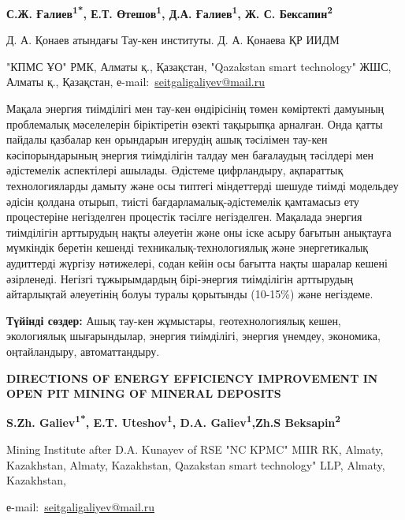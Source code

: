 {\bfseries С.Ж. Ғалиев\textsuperscript{1*}, Е.Т. Өтешов\textsuperscript{1},
Д.А. Ғалиев\textsuperscript{1}, Ж. С. Бексапин\textsuperscript{2}}

Д. А. Қонаев атындағы Тау-кен институты. Д. А. Қонаева ҚР ИИДМ

"КПМС ҰО" РМК, Алматы қ., Қазақстан, "Qazakstan smart technology" ЖШС,
Алматы қ., Қазақстан,
е-mail:~\href{https://e.mail.ru/compose/?mailto=mailto\%3aseitgaligaliyev@mail.ru}{seitgaligaliyev@mail.ru}~

Мақала энергия тиімділігі мен тау-кен өндірісінің төмен көміртекті
дамуының проблемалық мәселелерін біріктіретін өзекті тақырыпқа арналған.
Онда қатты пайдалы қазбалар кен орындарын игерудің ашық тәсілімен
тау-кен кәсіпорындарының энергия тиімділігін талдау мен бағалаудың
тәсілдері мен әдістемелік аспектілері ашылады. Әдістеме цифрландыру,
ақпараттық технологияларды дамыту және осы типтегі міндеттерді шешуде
тиімді модельдеу әдісін қолдана отырып, тиісті бағдарламалық-әдістемелік
қамтамасыз ету процестеріне негізделген процестік тәсілге негізделген.
Мақалада энергия тиімділігін арттырудың нақты әлеуетін және оны іске
асыру бағытын анықтауға мүмкіндік беретін кешенді
техникалық-технологиялық және энергетикалық аудиттерді жүргізу
нәтижелері, содан кейін осы бағытта нақты шаралар кешені әзірленеді.
Негізгі тұжырымдардың бірі-энергия тиімділігін арттырудың айтарлықтай
әлеуетінің болуы туралы қорытынды (10-15\%) және негіздеме.

{\bfseries Түйінді сөздер:} Ашық тау-кен жұмыстары, геотехнологиялық кешен,
экологиялық шығарындылар, энергия тиімділігі, энергия үнемдеу,
экономика, оңтайландыру, автоматтандыру.

{\bfseries DIRECTIONS OF ENERGY EFFICIENCY IMPROVEMENT IN OPEN PIT MINING
OF MINERAL DEPOSITS}

{\bfseries S.Zh. Galiev\textsuperscript{1*}, E.T.
Uteshov\textsuperscript{1}, D.A. Galiev\textsuperscript{1},Zh.S
Beksapin\textsuperscript{2}}

Mining Institute after D.A. Kunayev of RSE "NC KPMC" MIIR RK, Almaty,
Kazakhstan, Almaty, Kazakhstan, Qazakstan smart technology" LLP, Almaty,
Kazakhstan,

е-mail:~\href{https://e.mail.ru/compose/?mailto=mailto\%3aseitgaligaliyev@mail.ru}{seitgaligaliyev@mail.ru}~

